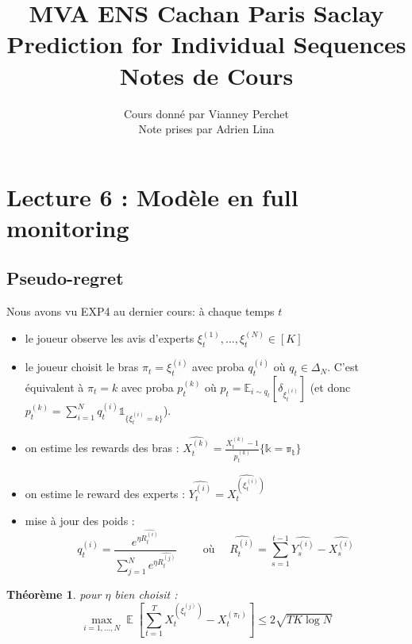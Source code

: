 \documentclass{article}
\DeclareMathOperator*{\E}{\mathbb{E}}
\newtheorem{theorem}{Théorème}[section]
\theoremstyle{remark}
\theoremstyle{remark}
\begin{document}
\title{%
  \large MVA ENS Cachan Paris Saclay \\
  \huge Prediction for Individual Sequences\\ Notes de Cours \\
}
\author{%
  Cours donné par Vianney Perchet \\
  Note prises par Adrien Lina
}

\maketitle

\section{Lecture 6 : Modèle en full monitoring}

\subsection{Pseudo-regret}

Nous avons vu EXP4 au dernier cours: à chaque temps $t$
\begin{itemize}
   \item le joueur observe les avis d'experts $\xi_t^{(1)}, ..., \xi_t^{(N)} \in [K]$
   \item le joueur choisit le bras $\pi_t = \xi_t^{(i)}$ avec proba $q_t^{(i)}$ où $q_t \in \Delta_N$. C'est équivalent à $\pi_t = k$ avec proba $p_t^{(k)}$ où $p_t = \mathbb{E}_{i \sim q_t}[\delta_{\xi_t^{(i)}}]$ (et donc $p_t^{(k)} = \sum\limits_{i=1}^N q_t^{(i)} \mathbb{1}_{\{\xi_t^{(i)} = k\}}$).
   \item on estime les rewards des bras : $\widehat{X_t^{(k)}} = \frac{X_t^{(k)}-1}{p_t^{(k)}} \mathbb{\{k=\pi_t\}}$
   \item on estime le reward des experts : $\widehat{Y_t^{(i)}} = \widehat{X_t^{(\xi_t^{(i)})}}$
   \item mise à jour des poids :
   $$
   q_t^{(i)} = \frac{e^{\eta \widehat{R_t^{(i)}}}}{\sum\limits_{j=1}^N e^{\eta \widehat{R_t^{(j)}}}}
   \quad \quad \text{ où } \quad
   \widehat{R_t^{(i)}} = \sum_{s=1}^{t-1} \widehat{Y_s^{(i)}} - \widehat{X_s^{(i)}}
   $$
\end{itemize}

\begin{theorem}
   pour $\eta$ bien choisit :
   $$
   \max_{i=1,...,N} \E\left[\sum_{t=1}^T X_t^{(\xi_t^{(j)})} - X_t^{(\pi_t)}\right] \leq 2 \sqrt{T K \log N}
   $$
\end{theorem}
\end{document}
